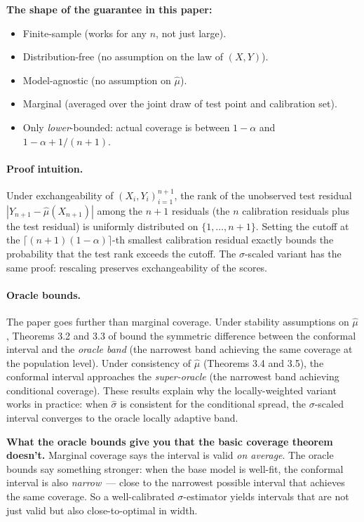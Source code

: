 \documentclass[letterpaper,11pt,leqno]{article}
\begin{document}
\begin{theoremexplain}
\textbf{The shape of the guarantee in this paper:}
\begin{itemize}
\item Finite-sample (works for any $n$, not just large).
\item Distribution-free (no assumption on the law of $(X, Y)$).
\item Model-agnostic (no assumption on $\hat{\mu}$).
\item Marginal (averaged over the joint draw of test point and calibration set).
\item Only \emph{lower}-bounded: actual coverage is between $1 - \alpha$ and $1 - \alpha + 1/(n+1)$.
\end{itemize}
\end{theoremexplain}

\paragraph{Proof intuition.} Under exchangeability of $(X_i, Y_i)_{i=1}^{n+1}$, the rank of the unobserved test residual $|Y_{n+1} - \hat{\mu}(X_{n+1})|$ among the $n+1$ residuals (the $n$ calibration residuals plus the test residual) is uniformly distributed on $\{1, \dots, n+1\}$. Setting the cutoff at the $\lceil(n+1)(1-\alpha)\rceil$-th smallest calibration residual exactly bounds the probability that the test rank exceeds the cutoff. The $\sigma$-scaled variant has the same proof: rescaling preserves exchangeability of the scores.

\paragraph{Oracle bounds.} The paper goes further than marginal coverage. Under stability assumptions on $\hat{\mu}$, Theorems 3.2 and 3.3 of \cite{lei2018distribution} bound the symmetric difference between the conformal interval and the \emph{oracle band} (the narrowest band achieving the same coverage at the population level). Under consistency of $\hat{\mu}$ (Theorems 3.4 and 3.5), the conformal interval approaches the \emph{super-oracle} (the narrowest band achieving conditional coverage). These results explain why the locally-weighted variant works in practice: when $\hat{\sigma}$ is consistent for the conditional spread, the $\sigma$-scaled interval converges to the oracle locally adaptive band.

\begin{explain}
\textbf{What the oracle bounds give you that the basic coverage theorem doesn't.} Marginal coverage says the interval is valid \emph{on average}. The oracle bounds say something stronger: when the base model is well-fit, the conformal interval is also \emph{narrow}~--- close to the narrowest possible interval that achieves the same coverage. So a well-calibrated $\sigma$-estimator yields intervals that are not just valid but also close-to-optimal in width.
\end{explain}
\end{document}
